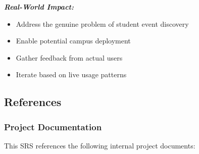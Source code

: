 \documentclass[12pt,a4paper]{article}
\begin{document}
\textbf{\textit{Real-World Impact:}}
\begin{itemize}
    \item Address the genuine problem of student event discovery
    \item Enable potential campus deployment
    \item Gather feedback from actual users
    \item Iterate based on live usage patterns
\end{itemize}

\subsection{References}

\subsubsection{Project Documentation}

This SRS references the following internal project documents:
\end{document}
